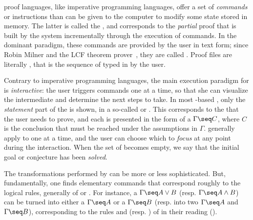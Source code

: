 \begin{description}[labelsep=0pt]
  proof languages, like imperative programming languages,
  offer a set of \emph{commands} or instructions than can be given to the
  computer to modify some state stored in memory. The latter is called the
  , and corresponds to the \emph{partial} proof that is built
  by the system incrementally through the execution of commands. In the dominant
  paradigm, these commands are provided by the user in text form; since Robin
  Milner and the LCF theorem prover~, they
  are called . Proof files are literally ,
  that is the sequence of  typed in by the user.
  
  \AP
  Contrary to imperative programming languages, the main execution paradigm for
   is \emph{interactive}: the user triggers commands one at a time,
  so that she can visualize the intermediate  and determine the next
  steps to take. In most -based ,
  only the \emph{statement} part of the  is shown, in a so-called
   or . This corresponds to the  that the
  user needs to prove, and each  is presented in the form of a  $\Gamma \seq C$, where $C$ is the conclusion that must be reached under the
  assumptions in $\Gamma$.  generally apply to one  at a time, and
  the user can choose which  to \emph{focus} at any point during the
  interaction. When the set of  becomes empty, we say that the initial goal
  or conjecture has been \emph{solved}.

  The transformations performed by  can be more or less sophisticated.
  But, fundamentally, one finds elementary commands that correspond roughly to
  the logical rules, generally of  or . For
  instance, a  $\Gamma\seq A\lor B$ (resp. $\Gamma\seq A\land B$) can be
  turned into either a  $\Gamma\seq A$ or a  $\Gamma\seq B$ (resp. into
  two  $\Gamma\seq A$ and $\Gamma\seq B$), corresponding to the rules
   and  (resp. ) of  in their
   reading ().


\end{description}
